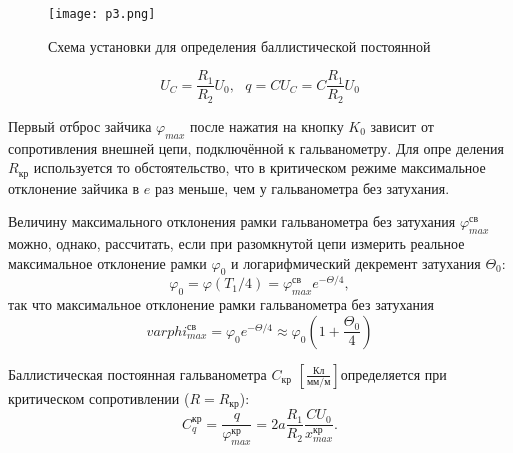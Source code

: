 \begin{figure}[h]
    \centering
    \texttt{[image: p3.png]}
    \caption{Схема установки для определения баллистической постоянной}
    \label{pic:p3}
\end{figure}

\begin{equation*}
    U_C = \frac{R_1}{R_2} U_0, \text{   } q = C U_C = C \frac{R_1}{R_2} U_0
\end{equation*}

Первый отброс зайчика $\varphi_{max}$ после нажатия на кнопку $K_0$ зависит от сопротивления внешней цепи, подключённой к гальванометру. Для опре­ деления $R_\text{кр}$ используется то обстоятельство, что в критическом режиме максимальное отклонение зайчика в $e$ раз меньше, чем у гальванометра без затухания.

Величину максимального отклонения рамки гальванометра без затухания $\varphi^\text{св}_{max}$ можно, однако, рассчитать, если при разомкнутой цепи измерить реальное максимальное отклонение рамки $\varphi_0$ и логарифми­ческий декремент затухания $\Theta_0$:
\begin{equation*}
    \varphi_0 = \varphi(T_1/4) = \varphi^\text{св}_{max} e^{-\Theta/4},
\end{equation*}
так что максимальное отклонение рамки гальванометра без затухания
\begin{equation}
    varphi^\text{св}_{max} = \varphi_0 e^{-\Theta/4} \approx \varphi_0 \left(1 + \frac{\Theta_0}{4}\right)
\end{equation}

Баллистическая постоянная гальванометра $C_\text{кр}$ $[\frac{\text{Кл}}{\text{мм/м}}]$определяется при критическом сопротивлении ($R = R_\text{кр}$):
\begin{equation}
    C^\text{кр}_q = \frac{q}{\varphi^\text{кр}_{max}} = 2a\frac{R_1}{R_2} \frac{CU_0}{x^\text{кр}_{max}}.
    \label{equ:Ckrq}
\end{equation}
